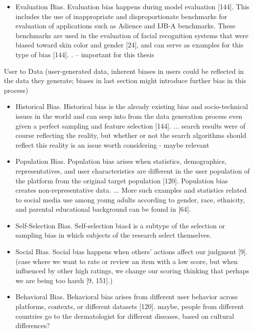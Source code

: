 \documentclass[12pt, a4paper, oneside]{book}   	%
\begin{document}
\begin{itemize}
				\item Evaluation Bias. Evaluation bias happens during model evaluation [144]. This includes the use of inappropriate and disproportionate benchmarks for evaluation of applications such as Adience and IJB-A benchmarks. These benchmarks are used in the evaluation of facial recognition systems that were biased toward skin color and gender [24], and can serve as examples for this type of bias [144]. \autocite{Mehrabi_2021}. -- important for this thesis
			\end{itemize}
			
			User to Data (user-generated data, inherent biases in users could be reflected in the data they generate; biases in last section might introduce further bias in this process) \autocite{Mehrabi_2021}
			\begin{itemize}
				\item Historical Bias. Historical bias is the already existing bias and socio-technical issues in the world and can seep into from the data generation process even given a perfect sampling and feature selection [144]. ... search results were of course reflecting the reality, but whether or not the search algorithms should reflect this reality is an issue worth considering \autocite{Mehrabi_2021} - maybe relevant
				\item Population Bias. Population bias arises when statistics, demographics, representatives, and user characteristics are different in the user population of the platform from the original target population [120]. Population bias creates non-representative data. ... More such examples and statistics related to social media use among young adults according to gender, race, ethnicity, and parental educational background can be found in [64]. \autocite{Mehrabi_2021}
				\item Self-Selection Bias. Self-selection bias4 is a subtype of the selection or sampling bias in which subjects of the research select themselves. \autocite{Mehrabi_2021}
				\item Social Bias. Social bias happens when others’ actions affect our judgment [9]. (case where we want to rate or review an item with a low score, but when influenced by other high ratings, we change our scoring thinking that perhaps we are being too harsh [9, 151].) \autocite{Mehrabi_2021}
				\item Behavioral Bias. Behavioral bias arises from different user behavior across platforms, contexts, or different datasets [120]. \autocite{Mehrabi_2021} maybe, people from different countries go to the dermatologist for different diseases, based on cultural differences?

\end{itemize}
\end{document}
